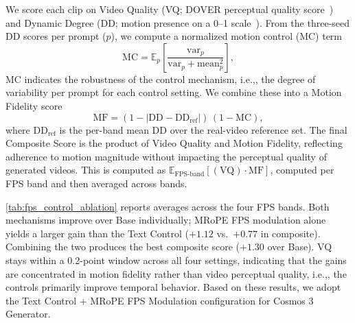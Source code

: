 \documentclass{llmxive}
\providecommand{\ie}{i.e.,\xspace}
\begin{document}
We score each clip on Video Quality (VQ; DOVER perceptual quality score~\citep{dover}) and Dynamic Degree (DD; motion presence on a 0--1 scale~\citep{huang2023vbench}). From the three-seed DD scores per prompt ($p$), we compute a normalized motion control (MC) term
\begin{equation}
    \text{MC} = \mathbb{E}_{p}\!\left[\frac{\text{var}_p}{\text{var}_p + \text{mean}_p^2}\right],
\end{equation}
MC indicates the robustness of the control mechanism, \ie, the degree of variability per prompt for each control setting. We combine these into a Motion Fidelity score
\begin{equation}
    \text{MF} = (1 - |\text{DD} - \text{DD}_{\text{ref}}|)\,(1 - \text{MC}),
\end{equation}
where $\text{DD}_{\text{ref}}$ is the per-band mean DD over the real-video reference set. The final Composite Score is the product of Video Quality and Motion Fidelity, reflecting adherence to motion magnitude without impacting the perceptual quality of generated videos. This is computed as $\mathbb{E}_{\text{FPS-band}}\!\left[(\text{VQ}) \cdot \text{MF}\right]$, computed per FPS band and then averaged across bands.

\cref{tab:fps_control_ablation} reports averages across the four FPS bands. Both mechanisms improve over Base individually; MRoPE FPS modulation alone yields a larger gain than the Text Control ($+1.12$ vs.\ $+0.77$ in composite). Combining the two produces the best composite score ($+1.30$ over Base). VQ stays within a 0.2-point window across all four settings, indicating that the gains are concentrated in motion fidelity rather than video perceptual quality, \ie, the controls primarily improve temporal behavior. Based on these results, we adopt the Text Control + MRoPE FPS Modulation configuration for Cosmos 3 Generator.
\end{document}
